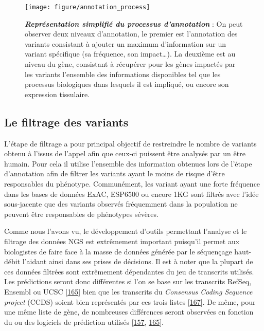 \documentclass[12pt,a4paper,twoside]{ugathesis}
\theoremstyle{definition}
\theoremstyle{definition}
\theoremstyle{definition}
\theoremstyle{remark}
\begin{document}
\begin{figure}

{\centering \texttt{[image: figure/annotation\_process]} 

}

\caption[Représentation simplifié du processus d'annotation]{\textbf{\emph{Représentation simplifié du processus
d'annotation}} : On peut observer deux niveaux d'annotation, le premier
est l'annotation des variants consistant à ajouter un maximum
d'information sur un variant spécifique (sa fréquence, son
impact\ldots{}). La deuxième est au niveau du gène, consistant à
récupérer pour les gènes impactés par les variants l'ensemble des
informations disponibles tel que les processus biologiques dans lesquels
il est impliqué, ou encore son expression tissulaire.}\label{fig:pictannot}
\end{figure}










\newpage

\subsection{Le filtrage des variants}\label{le-filtrage-des-variants}

L'étape de filtrage a pour principal objectif de restreindre le nombre
de variants obtenu à l'issus de l'appel afin que ceux-ci puissent être
analysés par un être humain. Pour cela il utilise l'ensemble des
information obtenues lors de l'étape d'annotation afin de filtrer les
variants ayant le moins de risque d'être responsables du phénotype.
Communément, les variant ayant une forte fréquence dans les bases de
données ExAC, ESP6500 ou encore 1KG sont filtrés avec l'idée
sous-jacente que des variants observés fréquemment dans la population ne
peuvent être responsables de phénotypes sévères.

Comme nous l'avons vu, le développement d'outils permettant l'analyse et
le filtrage des données NGS est extrêmement important puisqu'il permet
aux biologistes de faire face à la masse de données générée par le
séquençage haut-débit l'aidant ainsi dans ses prises de décisions. Il
est à noter que la plupart de ces données filtrées sont extrêmement
dépendantes du jeu de transcrits utilisés. Les prédictions seront donc
différentes si l'on se base sur les transcrits RefSeq, Ensembl ou UCSC
{[}\protect\hyperlink{ref-McCarthy2014}{165}{]} bien que les transcrits
du \emph{Consensus Coding Sequence project} (CCDS) soient bien
représentés par ces trois listes
{[}\protect\hyperlink{ref-Pruitt2009}{167}{]}. De même, pour une même
liste de gène, de nombreuses différences seront observées en fonction du
ou des logiciels de prédiction utilisés
{[}\protect\hyperlink{ref-Salgado2016}{157},
\protect\hyperlink{ref-McCarthy2014}{165}{]}.
\end{document}
